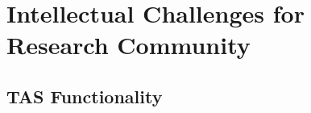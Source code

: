 \documentclass[sigconf]{acmart}
\begin{document}

%
%

\section{Intellectual Challenges for Research Community}


\subsection{TAS Functionality}
\end{document}
